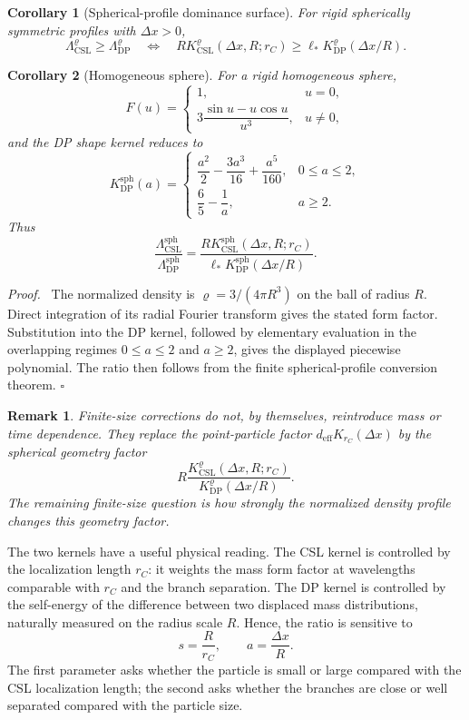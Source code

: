 \documentclass[
  aps,
  prd,
  preprint,
  notitlepage,
  superscriptaddress,
  nofootinbib,
  longbibliography
]{revtex4-2}
\newtheorem{corollary}{Corollary}
\newtheorem{remark}{Remark}
\newenvironment{proof}{\par\noindent\textit{Proof.}\ }{\hfill$\square$\par}
\newcommand{\dx}{\Delta x}
\newcommand{\Krc}{K_{r_C}}
\newcommand{\ellstar}{\ell_*}
\begin{document}
\begin{corollary}[Spherical-profile dominance surface]
For rigid spherically symmetric profiles with $\dx>0$,
\[
\Lambda_{\mathrm{CSL}}^\varrho\ge\Lambda_{\mathrm{DP}}^\varrho
\quad\Longleftrightarrow\quad
R K_{\mathrm{CSL}}^\varrho(\dx,R;r_C)
\ge\ellstar K_{\mathrm{DP}}^\varrho(\dx/R).
\]
\end{corollary}

\begin{corollary}[Homogeneous sphere]
\label{cor:homogeneous-sphere}
For a rigid homogeneous sphere,
\[
F(u)=
\begin{cases}
1,&u=0,\\[1mm]
3\dfrac{\sin u-u\cos u}{u^3},&u\ne0,
\end{cases}
\]
and the DP shape kernel reduces to
\[
K_{\mathrm{DP}}^{\mathrm{sph}}(a)=
\begin{cases}
\dfrac{a^2}{2}-\dfrac{3a^3}{16}+\dfrac{a^5}{160},&0\le a\le2,\\[2mm]
\dfrac65-\dfrac1a,&a\ge2.
\end{cases}
\]
Thus
\[
\frac{\Lambda_{\mathrm{CSL}}^{\mathrm{sph}}}{\Lambda_{\mathrm{DP}}^{\mathrm{sph}}}
=\frac{R K_{\mathrm{CSL}}^{\mathrm{sph}}(\dx,R;r_C)}
{\ellstar K_{\mathrm{DP}}^{\mathrm{sph}}(\dx/R)}.
\]
\end{corollary}

\begin{proof}
The normalized density is $\varrho=3/(4\pi R^3)$ on the ball of radius $R$. Direct integration of its radial Fourier transform gives the stated form factor. Substitution into the DP kernel, followed by elementary evaluation in the overlapping regimes $0\le a\le2$ and $a\ge2$, gives the displayed piecewise polynomial. The ratio then follows from the finite spherical-profile conversion theorem.
\end{proof}

\begin{remark}
Finite-size corrections do not, by themselves, reintroduce mass or time dependence. They replace the point-particle factor $d_{\mathrm{eff}}\Krc(\dx)$ by the spherical geometry factor
\[
R\frac{K_{\mathrm{CSL}}^\varrho(\dx,R;r_C)}{K_{\mathrm{DP}}^\varrho(\dx/R)}.
\]
The remaining finite-size question is how strongly the normalized density profile changes this geometry factor.
\end{remark}

The two kernels have a useful physical reading. The CSL kernel is controlled by the localization length $r_C$: it weights the mass form factor at wavelengths comparable with $r_C$ and the branch separation. The DP kernel is controlled by the self-energy of the difference between two displaced mass distributions, naturally measured on the radius scale $R$. Hence, the ratio is sensitive to
\[
s=\frac{R}{r_C},
\qquad
a=\frac{\dx}{R}.
\]
The first parameter asks whether the particle is small or large compared with the CSL localization length; the second asks whether the branches are close or well separated compared with the particle size.
\end{document}
